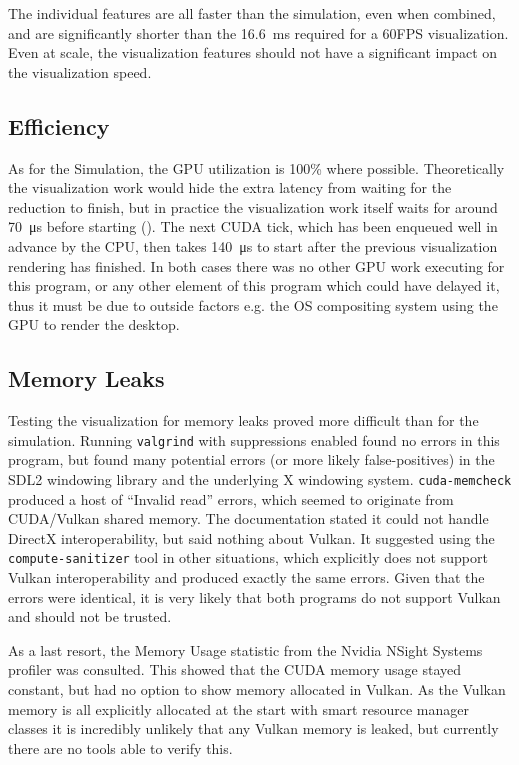 

The individual features are all faster than the simulation, even when combined, and are significantly shorter than the \SI{16.6}{\milli\second} required for a 60FPS visualization.
Even at scale, the visualization features should not have a significant impact on the visualization speed.

\subsection{Efficiency}\label{sec:Results:Viz:Efficiency}
As for the Simulation, the GPU utilization is 100\% where possible.
Theoretically the visualization work would hide the extra latency from waiting for the reduction to finish, but in practice the visualization work itself waits for around \SI{70}{\micro\second} before starting ().
The next CUDA tick, which has been enqueued well in advance by the CPU, then takes \SI{140}{\micro\second} to start after the previous visualization rendering has finished.
In both cases there was no other GPU work executing for this program, or any other element of this program which could have delayed it, thus it must be due to outside factors e.g. the OS compositing system using the GPU to render the desktop.


\subsection{Memory Leaks}\label{sec:Results:Viz:Memory}
Testing the visualization for memory leaks proved more difficult than for the simulation.
Running \texttt{valgrind} with suppressions enabled found no errors in this program, but found many potential errors (or more likely false-positives) in the SDL2 windowing library and the underlying X windowing system.
\texttt{cuda-memcheck} produced a host of ``Invalid read'' errors, which seemed to originate from CUDA/Vulkan shared memory.
The documentation stated it could not handle DirectX interoperability, but said nothing about Vulkan.
It suggested using the \texttt{compute-sanitizer} tool in other situations, which explicitly does not support Vulkan interoperability and produced exactly the same errors.
Given that the errors were identical, it is very likely that both programs do not support Vulkan and should not be trusted.

As a last resort, the Memory Usage statistic from the Nvidia NSight Systems profiler was consulted.
This showed that the CUDA memory usage stayed constant, but had no option to show memory allocated in Vulkan.
As the Vulkan memory is all explicitly allocated at the start with smart resource manager classes it is incredibly unlikely that any Vulkan memory is leaked, but currently there are no tools able to verify this.
